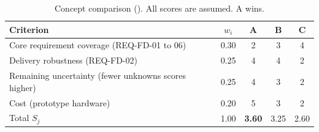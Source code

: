 
\begin{table}[!t]
\centering
\scriptsize
\renewcommand{\arraystretch}{1.1}
\setlength{\tabcolsep}{4pt}
\caption{Concept comparison (\Lscore). All scores are assumed. A wins.}
\label{tab:concepts}
\begin{tabular}{@{}lcccc@{}}
\toprule
Criterion & $w_i$ & A & B & C \\
\midrule
Core requirement coverage (REQ-FD-01 to 06) & 0.30 & 2 & 3 & 4 \\
Delivery robustness (REQ-FD-02) & 0.25 & 4 & 4 & 2 \\
Remaining uncertainty (fewer unknowns scores higher) & 0.25 & 4 & 3 & 2 \\
Cost (prototype hardware) & 0.20 & 5 & 3 & 2 \\
\midrule
Total $S_j$ & 1.00 & \textbf{3.60} & 3.25 & 2.60 \\
\bottomrule
\end{tabular}
\end{table}
